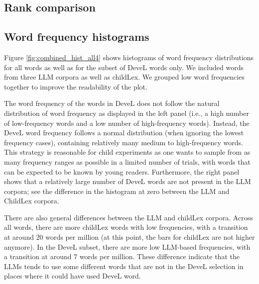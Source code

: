 \documentclass[manuscript]{stjour}
\begin{document}
\subsection{Rank comparison}

\begin{figure}[!htbp]
    \label{fig:rankplot-normal2}
\end{figure}

\clearpage


\subsection{Word frequency histograms}

Figure \ref{fig:combined_hist_all4} shows histograms of word frequency distributions for all words as well as for the subset of DeveL words only. We included words from three LLM corpora as well as childLex. We grouped low word frequencies together to improve the readability of the plot. 

The word frequency of the words in DeveL does not follow the natural distribution of word frequency as displayed in the left panel (i.e., a high number of low-frequency words and a low number of high-frequency words). Instead, the DeveL word frequency follows a normal distribution (when ignoring the lowest frequency cases), containing relatively many medium to high-frequency words. This strategy is reasonable for child experiments as one wants to sample from as many frequency ranges as possible in a limited number of trials, with words that can be expected to be known by young readers. Furthermore, the right panel shows that a relatively large number of DeveL words are not present in the LLM corpora; see the difference in the histogram at zero between the LLM and ChildLex corpora. 

There are also general differences between the LLM and childLex corpora. Across all words, there are more childLex words with low frequencies, with a transition at around 20 words per million (at this point, the bars for childLex are not higher anymore). In the DeveL subset, there are more low LLM-based frequencies, with a transition at around 7 words per million. These difference indicate that the LLMs tends to use some different words that are not in the DeveL selection in places where it could have used DeveL word. 
\end{document}
